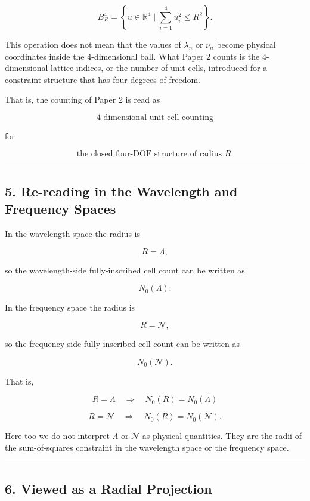 \documentclass[
]{article}
\begin{document}
\[
B^4_R
=
\left\{
u\in\mathbb{R}^4
\mid
\sum_{i=1}^{4}u_i^2\le R^2
\right\} .
\]

This operation does not mean that the values of \(\lambda_n\) or
\(\nu_n\) become physical coordinates inside the 4-dimensional ball.
What Paper 2 counts is the 4-dimensional lattice indices, or the number
of unit cells, introduced for a constraint structure that has four
degrees of freedom.

That is, the counting of Paper 2 is read as

\[
\text{4-dimensional unit-cell counting}
\]

for

\[
\text{the closed four-DOF structure of radius }R .
\]

\begin{center}\rule{0.5\linewidth}{0.5pt}\end{center}

\subsection{5. Re-reading in the Wavelength and Frequency
Spaces}\label{re-reading-in-the-wavelength-and-frequency-spaces}

In the wavelength space the radius is

\[
R=\Lambda ,
\]

so the wavelength-side fully-inscribed cell count can be written as

\[
N_0(\Lambda) .
\]

In the frequency space the radius is

\[
R=\mathcal{N} ,
\]

so the frequency-side fully-inscribed cell count can be written as

\[
N_0(\mathcal{N}) .
\]

That is,

\[
R=\Lambda
\quad\Rightarrow\quad
N_0(R)=N_0(\Lambda)
\]

\[
R=\mathcal{N}
\quad\Rightarrow\quad
N_0(R)=N_0(\mathcal{N}) .
\]

Here too we do not interpret \(\Lambda\) or \(\mathcal{N}\) as physical
quantities. They are the radii of the sum-of-squares constraint in the
wavelength space or the frequency space.

\begin{center}\rule{0.5\linewidth}{0.5pt}\end{center}

\subsection{6. Viewed as a Radial
Projection}\label{viewed-as-a-radial-projection}
\end{document}

